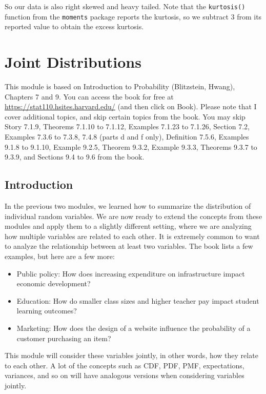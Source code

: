 \documentclass[
]{book}
\providecommand{\tightlist}{%
  \setlength{\itemsep}{0pt}\setlength{\parskip}{0pt}}
\begin{document}
So our data is also right skewed and heavy tailed. Note that the \texttt{kurtosis()} function from the \texttt{moments} package reports the kurtosis, so we subtract 3 from its reported value to obtain the excess kurtosis.

\hypertarget{joint-distributions}{%
\chapter{Joint Distributions}\label{joint-distributions}}

This module is based on Introduction to Probability (Blitzstein, Hwang), Chapters 7 and 9. You can access the book for free at \url{https://stat110.hsites.harvard.edu/} (and then click on Book). Please note that I cover additional topics, and skip certain topics from the book. You may skip Story 7.1.9, Theorems 7.1.10 to 7.1.12, Examples 7.1.23 to 7.1.26, Section 7.2, Examples 7.3.6 to 7.3.8, 7.4.8 (parts d and f only), Definition 7.5.6, Examples 9.1.8 to 9.1.10, Example 9.2.5, Theorem 9.3.2, Example 9.3.3, Theorems 9.3.7 to 9.3.9, and Sections 9.4 to 9.6 from the book.

\hypertarget{introduction-1}{%
\section{Introduction}\label{introduction-1}}

In the previous two modules, we learned how to summarize the distribution of individual random variables. We are now ready to extend the concepts from these modules and apply them to a slightly different setting, where we are analyzing how multiple variables are related to each other. It is extremely common to want to analyze the relationship between at least two variables. The book lists a few examples, but here are a few more:

\begin{itemize}
\tightlist
\item
  Public policy: How does increasing expenditure on infrastructure impact economic development?
\item
  Education: How do smaller class sizes and higher teacher pay impact student learning outcomes?
\item
  Marketing: How does the design of a website influence the probability of a customer purchasing an item?
\end{itemize}

This module will consider these variables jointly, in other words, how they relate to each other. A lot of the concepts such as CDF, PDF, PMF, expectations, variances, and so on will have analogous versions when considering variables jointly.
\end{document}
